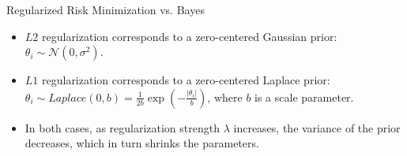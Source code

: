 \begin{vbframe} {Regularized Risk Minimization vs. Bayes}
\begin{itemize}
  \item $L2$ regularization corresponds to a zero-centered Gaussian prior: 
  $\theta_i \sim \mathcal{N}(0,\sigma^2)$.
  \item $L1$ regularization corresponds to a zero-centered Laplace prior: 
  $\theta_i \sim \mathit{Laplace}(0,b) = 
  \frac{1}{2b}\exp(-\frac{|\theta_i|}{b})$, where $b$ is a scale parameter.
  \item In both cases, as regularization strength $\lambda$ increases, the 
  variance of the prior decreases, which in turn shrinks the parameters.
\end{itemize}
  
\end{vbframe}









